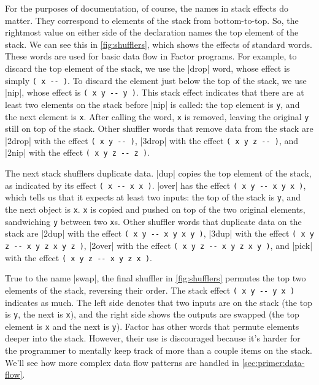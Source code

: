 For the purposes of documentation, of course, the names in stack effects do
matter.  They correspond to elements of the stack from bottom-to-top.  So, the
rightmost value on either side of the declaration names the top element of the
stack.  We can see this in \vref{fig:shufflers}, which shows the effects of
standard  words.  These words are used for basic data flow
in Factor programs.  For example, to discard the top element of the stack, we
use the \factor|drop| word, whose effect is simply
%
\Verb|( x -- )|.
%
To discard the element just below the top of the stack, we use \factor|nip|,
whose effect is
%
\Verb|( x y -- y )|.
%
This stack effect indicates that there are at least two elements on the stack
before \factor|nip| is called: the top element is \Verb|y|, and the next
element is \Verb|x|.  After calling the word, \Verb|x| is removed, leaving
the original \Verb|y| still on top of the stack.  Other shuffler words that
remove data from the stack are
%
\factor|2drop| with the effect \Verb|( x y -- )|,
%
\factor|3drop| with the effect \Verb|( x y z -- )|, and
%
\factor|2nip| with the effect \Verb|( x y z -- z )|.

The next stack shufflers duplicate data.  \factor|dup| copies the top element
of the stack, as indicated by its effect \Verb|( x -- x x )|.  \factor|over|
has the effect \Verb|( x y -- x y x )|, which tells us that it expects at
least two inputs: the top of the stack is \Verb|y|, and the next object is
\Verb|x|.  \Verb|x| is copied and pushed on top of the two original
elements, sandwiching \Verb|y| between two \Verb|x|s.  Other shuffler words
that duplicate data on the stack are
%
\factor|2dup| with the effect \Verb|( x y -- x y x y )|,
%
\factor|3dup| with the effect \Verb|( x y z -- x y z x y z )|,
%
\factor|2over| with the effect \Verb|( x y z -- x y z x y )|, and
%
\factor|pick| with the effect \Verb|( x y z -- x y z x )|.

True to the name \factor|swap|, the final shuffler in \vref{fig:shufflers}
permutes the top two elements of the stack, reversing their order.  The stack
effect
%
\Verb|( x y -- y x )|
%
indicates as much.  The left side denotes that two inputs are on the stack (the
top is \Verb|y|, the next is \Verb|x|), and the right side shows the
outputs are swapped (the top element is \Verb|x| and the next is \Verb|y|).
Factor has other words that permute elements deeper into the stack.  However,
their use is discouraged because it's harder for the programmer to mentally
keep track of more than a couple items on the stack.  We'll see how more
complex data flow patterns are handled in \cref{sec:primer:data-flow}.
